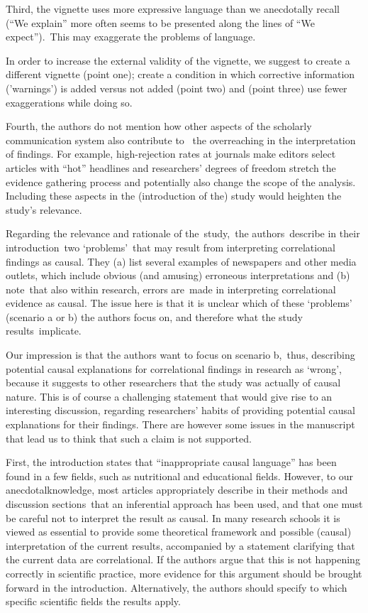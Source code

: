 \documentclass[10pt]{article}
\begin{document}
Third, the vignette uses more expressive language than we anecdotally
recall (``We explain'' more often seems to be presented along the lines
of ``We expect'').~This may exaggerate the problems of language.~

In order to increase the external validity of the vignette, we suggest
to create a different vignette (point one); create a condition in which
corrective information ('warnings') is added versus not added (point
two) and (point three) use fewer exaggerations while doing so.~~

Fourth, the authors do not mention how other aspects of the scholarly
communication system also contribute to~ the overreaching in the
interpretation of findings. For example, high-rejection rates at
journals make editors select articles with ``hot'' headlines and
researchers' degrees of freedom stretch the evidence gathering process
and potentially also change the scope of the analysis. Including these
aspects in the (introduction of the) study would heighten the study's
relevance.

Regarding the relevance and rationale of the~study,~the authors~describe
in their introduction~two `problems'~that may result from interpreting
correlational findings as causal. They (a) list several examples of
newspapers and other media outlets, which include obvious (and amusing)
erroneous interpretations and (b) note~that also within research, errors
are~made in interpreting correlational evidence as causal. The issue
here is that it is unclear which of these `problems' (scenario a or b)
the authors focus on, and therefore what the study results~implicate.

Our impression is that the authors want to focus on scenario b,~thus,
describing potential causal explanations for correlational findings in
research as `wrong', because it suggests to other researchers that the
study was actually of causal nature. This is of course a challenging
statement that would give rise to an interesting discussion, regarding
researchers' habits of providing potential causal explanations for their
findings. There are however some issues in the manuscript that lead us
to think that such a claim is not supported.

First, the introduction states that ``inappropriate causal language''
has been found in a few fields, such as nutritional and educational
fields. However, to our anecdotalknowledge, most articles appropriately
describe in their methods and discussion sections~that an inferential
approach has been used, and that one must be careful not to interpret
the result as causal. In many research schools it is viewed as essential
to provide some theoretical framework and possible (causal)
interpretation of the current results, accompanied by a statement
clarifying that the current data are correlational. If the authors argue
that this is not happening correctly in scientific practice, more
evidence for this argument should be brought forward in the
introduction. Alternatively, the authors should specify to which
specific scientific fields the results apply.
\end{document}
